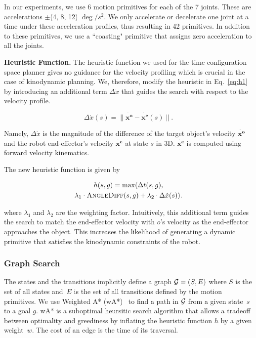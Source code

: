 \documentclass[a4paper]{report}
\begin{document}
In our experiments, we use 6 motion primitives for each of the 7 joints. These are accelerations $\pm$(4, 8, 12) $\deg/s^2$. We only accelerate or decelerate one joint at a time under these acceleration profiles, thus resulting in 42 primitives. In addition to these primitives, we use a ``coasting" primitive that assigns zero acceleration to all the joints.

\textbf{Heuristic Function.}
The heuristic function we used for the time-configuration space planner gives no guidance for the velocity profiling which is crucial in the case of kinodynamic planning. We, therefore, modify the heuristic in Eq.~\ref{eq:h1} by introducing an additional term $\Delta \dot{x}$ that guides the search with respect to the velocity profile.

\begin{equation}
\Delta \dot{x}(s) = \|\mathbf{\dot{x^o} - \dot{x^e}}(s)\|.
\end{equation}

Namely, $\Delta \dot{x}$ is the magnitude of the difference of the target object's velocity $\mathbf{\dot{x^o}}$ and the robot end-effector's velocity $\mathbf{\dot{x^e}}$ at state $s$ in 3D. $\mathbf{\dot{x^e}}$ is computed using forward velocity kinematics.

The new heuristic function is given by

\begin{multline}
 h(s,g) = \max (\Delta t(s,g), \\
 \lambda_1 \cdot \textsc{AngleDiff}(s,g) + \lambda_2 \cdot \Delta \dot{x}(s)).
\end{multline}

where $\lambda_1$ and $\lambda_2$ are the weighting factor. Intuitively, this additional term guides the search to match the end-effector velocity with $o$'s velocity as the end-effector approaches the object. This increases the likelihood of generating a dynamic primitive that satisfies the kinodynamic constraints of the robot. 

\subsubsection{Graph Search}
The states and the transitions implicitly define a graph $\mathcal{G} = (S,E)$ where $S$ is the set of all states and~$E$ is the set of all transitions defined by the motion primitives. We use Weighted A* (wA*)~\cite{pohl1970heuristic} to find a path in $\mathcal{G}$ from a given state~$s$ to a goal $g$. 
wA* is a suboptimal heursitic search algorithm that allows a tradeoff between optimality and greediness by inflating the heuristic function $h$ by a given weight~$w$. The cost of an edge is the time of its traversal.
\end{document}
